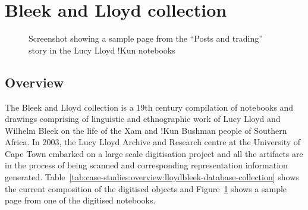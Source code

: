 \section[Bleek\& Lloyd collection]{Bleek and Lloyd collection}
\label{sec:case-studies:bleek-and-lloyd}

\begin{figure}
  \centering
\caption[Screenshot showing a sample page from Bleek\& Lloyd collection]{Screenshot showing a sample page from the ``Posts and trading'' story in the Lucy Lloyd !Kun notebooks}
\label{fig:case-studies:bleek-and-lloyd:brief-history:case-studies.bleek-and-lloyd.A2_1_112_09231}
\end{figure}

\subsection[Overview]{Overview}
\label{sec:case-studies:bleek-and-lloyd:brief-history}

The Bleek and Lloyd collection \citep{Skotnes2007} is a 19th century compilation of notebooks and drawings comprising of linguistic and ethnographic work of Lucy Lloyd and Wilhelm Bleek on the life of the \textbar Xam and !Kun Bushman people of Southern Africa. In 2003, the Lucy Lloyd Archive and Research centre at the University of Cape Town embarked on a large scale digitisation project and all the artifacts are in the process of being scanned and corresponding representation information generated. Table~\ref{tab:case-studies:overview:lloydbleek-database-collection} shows the current composition of the digitised objects and Figure~\ref{fig:case-studies:bleek-and-lloyd:brief-history:case-studies.bleek-and-lloyd.A2_1_112_09231} shows a sample page from one of the digitised notebooks.

